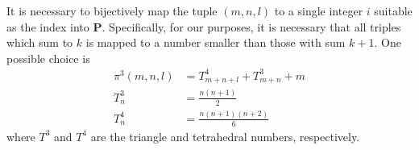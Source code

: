 \documentclass[10pt,english]{article}
\begin{document}
It is necessary to bijectively map the tuple $(m,n,l)$ to a single integer $i$ suitable as the index into $\mathbf P$. Specifically, for our purposes, it is necessary that all triples which sum to $k$ is mapped to a number smaller than those with sum $k+1$. One possible choice is \begin{align*}
\pi^3(m,n,l) &= T^4_{m+n+l} + T^3_{m+n} + m \\
T^3_n &= \frac{n(n+1)}{2} \\
T^4_n &= \frac{n(n+1)(n+2)}{6}
\end{align*}
where $T^3$ and $T^4$ are the triangle and tetrahedral numbers, respectively.
\end{document}
